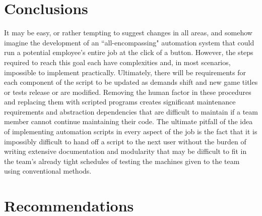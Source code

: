 \documentclass[12pt]{article}
\begin{document}




\newpage
\section{Conclusions}



\indent\hspace{0.5in} It may be easy, or rather tempting to suggest changes in all areas, and somehow imagine the development of an “all-encompassing" automation system that could run a potential employee's entire job at the click of a button. However, the steps required to reach this goal each have complexities and, in most scenarios, impossible to implement practically. Ultimately, there will be requirements for each component of the script to be updated as demands shift and new game titles or tests release or are modified. Removing the human factor in these procedures and replacing them with scripted programs creates significant maintenance requirements and abstraction dependencies that are difficult to maintain if a team member cannot continue maintaining their code. The ultimate pitfall of the idea of implementing automation scripts in every aspect of the job is the fact that it is impossibly difficult to hand off a script to the next user without the burden of writing extensive documentation and modularity that may be difficult to fit in the team's already tight schedules of testing the machines given to the team using conventional methods.

\newpage
\section{Recommendations}
\end{document}
